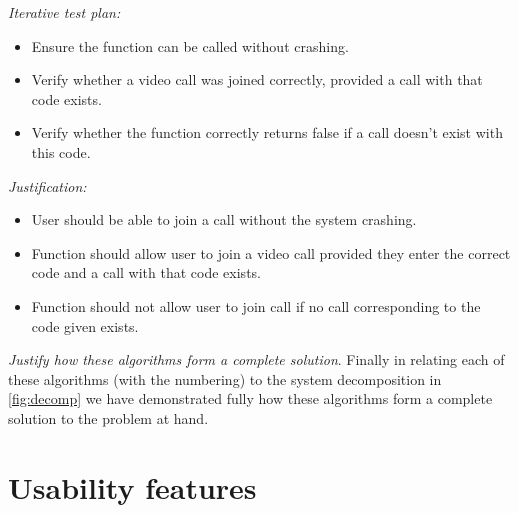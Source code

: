 \textit{Iterative test plan: }  \\

\begin{itemize}

\item{Ensure the function can be called without crashing.}

\item{Verify whether a video call was joined correctly,
provided a call with that code exists.}

\item{Verify whether the function correctly returns false
if a call doesn't exist with this code.}

\end{itemize}

\textit{Justification: } \\

\begin{itemize}

\item User should be able to join a call without the system crashing.

\item{Function should allow user to join a video call provided they
	enter the correct code and a call with that code exists.}

\item Function should not allow user to join call if no call corresponding to the code given exists.

\end{itemize}

\vspace{0.2cm}

\textit{Justify how these algorithms form a complete solution}.
Finally in relating each of these algorithms (with the
numbering) to the system decomposition in \ref{fig:decomp}
we have demonstrated fully how these algorithms form a
complete solution to the problem at hand.


\section{Usability features}
\label{sec:usability}

